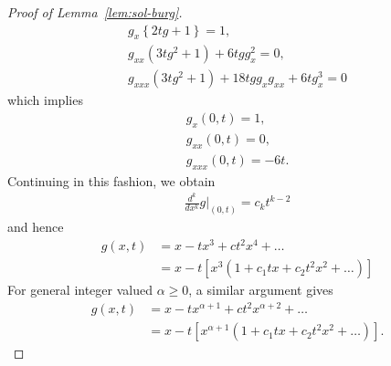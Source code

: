 \documentclass[12pt,reqno]{amsart}
\numberwithin{equation}{section}  %
\numberwithin{figure}{section}
\begin{document}
\begin{proof}[Proof of Lemma~\ref{lem:sol-burg}]
\begin{gather*}
    g_{x}\left \{ 2t g + 1 \right \} = 1,
    \\
    g_{xx}(3tg^{2} + 1) + 6tgg_{x}^{2} = 0,
    \\
    g_{xxx}(3tg^{2} + 1) + 18tgg_{x}g_{xx} + 6tg_{x}^{3} = 0
\end{gather*}
%
%
which implies
%
%
\begin{gather*}
g_{x}(0, t) =1,
\\
g_{xx}(0, t) = 0,
\\
g_{xxx}(0, t) = -6t.
\end{gather*}
%
Continuing in this fashion, we obtain
%
%
\begin{equation*}
\begin{split}
\frac{d^{k}}{dx^{k}} g |_{(0, t)} = c_{k}t^{k-2}
\end{split}
\end{equation*}
%
%
and hence
%
%
\begin{equation*}
\begin{split}
g(x,t) & = x - tx^{3} + ct^{2}x^{4} + \ldots
\\
& = x - t[x^{3}(1 + c_{1}tx + c_{2}t^{2}x^{2} + \ldots)] 
\end{split}
\end{equation*}
%
For general integer valued $\alpha \ge 0$, a similar argument gives
%
\begin{equation}
  \label{eq-gen}
\begin{split}
g(x,t) & = x - tx^{\alpha + 1} + ct^{2}x^{\alpha + 2} + \ldots
\\
& = x - t[x^{\alpha + 1}(1 + c_{1}tx + c_{2}t^{2}x^{2} + \ldots)].
\end{split}
\end{equation}


\end{proof}
\end{document}
